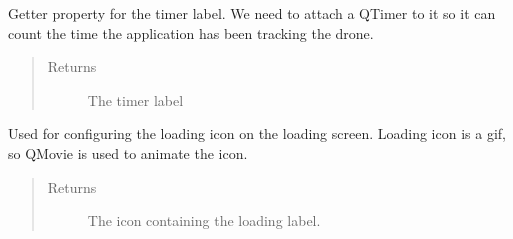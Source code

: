 \documentclass[letterpaper,10pt,english]{sphinxmanual}
\begin{document}
\begin{fulllineitems}
\begin{fulllineitems}
\begin{quote}
\begin{description}
\end{description}\end{quote}

\end{fulllineitems}


\begin{fulllineitems}
\label{\detokenize{index:src.Views.View_LoadingScreen.LoadingWindow.set_LblStatus}}
Getter property for the timer label. We need to attach a QTimer to it so it can count the time the
application has been tracking the drone.
\begin{quote}\begin{description}
\item[{Returns}] \leavevmode
The timer label

\end{description}\end{quote}

\end{fulllineitems}


\begin{fulllineitems}
\label{\detokenize{index:src.Views.View_LoadingScreen.LoadingWindow.setupLoadingIcon}}
Used for configuring the loading icon on the loading screen.
Loading icon is a gif, so QMovie is used to animate the icon.
\begin{quote}\begin{description}
\item[{Returns}] \leavevmode
The icon containing the loading label.

\end{description}\end{quote}

\end{fulllineitems}



\end{fulllineitems}
\end{document}
